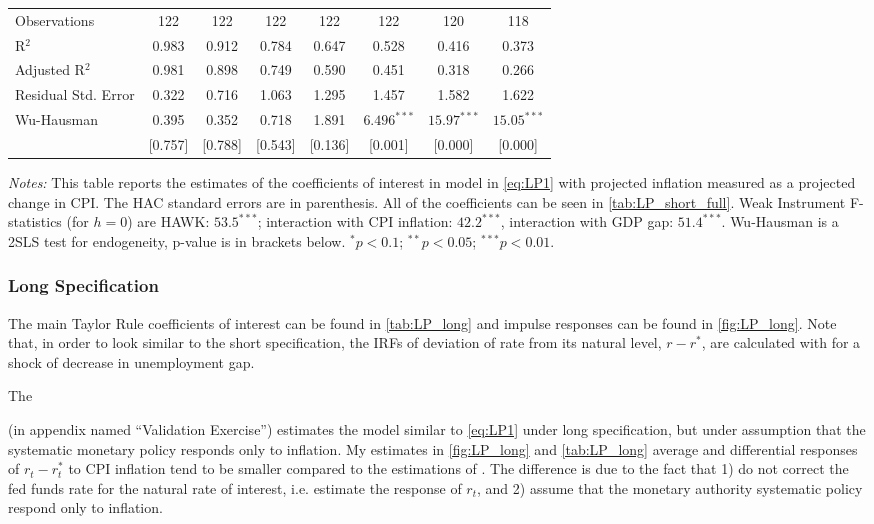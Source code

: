 \documentclass[11pt]{article}
\begin{document}
\begin{table}[!hbtp]
\begin{threeparttable}
\begin{tabular}{@{\extracolsep{5pt}}lccccccc}
       Observations & 122 & 122 & 122 & 122 & 122 & 120 & 118 \\ 
       R$^{2}$ & 0.983 & 0.912 & 0.784 & 0.647 & 0.528 & 0.416 & 0.373 \\ 
       Adjusted R$^{2}$ & 0.981 & 0.898 & 0.749 & 0.590 & 0.451 & 0.318 & 0.266 \\ 
       Residual Std. Error & 0.322 & 0.716 & 1.063 & 1.295 & 1.457 & 1.582 & 1.622 \\ 
       Wu-Hausman & 0.395& 0.352& 0.718& 1.891& $6.496^{***}$ &$15.97^{***}$& $15.05^{***}$ \\ 
       & [0.757] & [0.788]& [0.543] & [0.136] &[0.001] & [0.000] & [0.000]\\ \hline 
       \hline 
    \end{tabular}
    \begin{tablenotes}[flushleft]\scriptsize
      \item \textit{Notes:} 
      This table reports the estimates of the coefficients of interest in model in \vref{eq:LP1} with projected inflation measured as a projected change in CPI. 
      The \citet{Andrews1991} HAC standard errors are in parenthesis. 
      All of the coefficients can be seen in \vref{tab:LP_short_full}. 
      Weak Instrument F-statistics (for $h=0$) are HAWK: $53.5^{***}$; interaction with CPI inflation: $42.2^{***}$, interaction with GDP gap: $51.4^{***}$. Wu-Hausman is a 2SLS test for endogeneity, p-value is in brackets below. $^{*}p<0.1$; $^{**}p<0.05$; $^{***}p<0.01$.
    \end{tablenotes}
    \end{threeparttable}  
    \end{table}
  
  





  \subsubsection{Long Specification}

  The main Taylor Rule coefficients of interest can be found in \vref{tab:LP_long} and impulse responses can be found in \vref{fig:LP_long}. Note that, in order to look similar to the short specification, the IRFs of deviation of rate from its natural level, $r-r^*$, are calculated with for a shock of decrease in unemployment gap.

  The 
  
  \citet{HIM2023} (in appendix named ``Validation Exercise'') estimates the model similar to \vref{eq:LP1} under long specification, but under assumption that the systematic monetary policy responds only to inflation. My estimates in \vref{fig:LP_long} and \vref{tab:LP_long} average and differential responses of $r_t-r_t^*$ to CPI inflation tend to be smaller compared to the estimations of \citet{HIM2023}. 
  The difference is due to the fact that \citet{HIM2023} 1) do not correct the fed funds rate for the natural rate of interest, i.e. estimate the response of $r_t$, and 2) assume that the monetary authority systematic policy respond only to inflation. 
\end{document}
